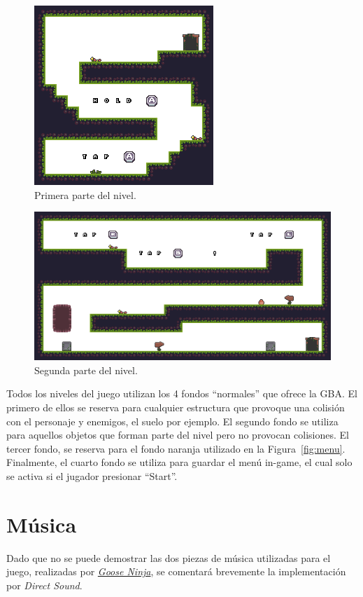 \vspace{1cm}

\begin{figure}[h]
	\centering
	\includegraphics[width=.55\textwidth]{capitulos/capitulo6/level_1_0.png}
	\caption{Primera parte del nivel.}\label{fig:lvl1_0}
\end{figure}

\begin{figure}[h]
	\centering
	\includegraphics[width=.9\textwidth]{capitulos/capitulo6/level_1_1.png}
	\caption{Segunda parte del nivel.}\label{fig:lvl1_1}
\end{figure}
\FloatBarrier{}

Todos los niveles del juego utilizan los 4 fondos ``normales'' que ofrece la GBA. El primero de ellos se reserva para cualquier estructura que provoque una colisión con el personaje y enemigos, el suelo por ejemplo. El segundo fondo se utiliza para aquellos objetos que forman parte del nivel pero no provocan colisiones. El tercer fondo, se reserva para el fondo naranja utilizado en la Figura~\ref{fig:menu}. Finalmente, el cuarto fondo se utiliza para guardar el menú in-game, el cual solo se activa si el jugador presionar ``Start''. 

\section{Música}
Dado que no se puede demostrar las dos piezas de música utilizadas para el juego, realizadas por \textit{\href{https://gooseninja.itch.io/}{Goose Ninja}}, se comentará brevemente la implementación por \textit{Direct Sound}.

